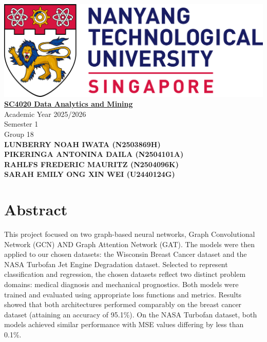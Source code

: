 \documentclass[12pt]{article}
\begin{document}
\begin{center}
    \includegraphics[width=\linewidth]{NTU_Logo.png}
    \\[1cm]
    \underline{\textbf{SC4020 Data Analytics and Mining}}
    \\[1.5em]
    Academic Year 2025/2026
    \\[1em]
    Semester 1
    \\[2em]
    Group 18
    \\[5em]
    \textbf{
        LUNBERRY NOAH IWATA (N2503869H) \\[1em]
        PIKERINGA ANTONINA DAILA (N2504101A) \\[1em]
        RAHLFS FREDERIC MAURITZ (N2504096K) \\[1em]
        SARAH EMILY ONG XIN WEI (U2440124G) \\[1em]
        }
\end{center}
\pagebreak

\justifying

\pagestyle{fancy}
\fancyhf{}  %
\fancyhead[R]{\textcolor{gray}{\nouppercase{\leftmark}}}   %
\fancyfoot[C]{\thepage}  %


\section*{Abstract}

This project focused on two graph-based neural networks, Graph Convolutional Network (GCN) AND Graph Attention Network (GAT).
The models were then applied to our chosen datasets: the Wisconsin Breast Cancer dataset and the NASA Turbofan Jet Engine Degradation dataset.
Selected to represent classification and regression, the chosen datasets reflect two distinct problem domains: medical diagnosis and mechanical prognostics.
Both models were trained and evaluated using appropriate loss functions and metrics.
Results showed that both architectures performed comparably on the breast cancer dataset (attaining an accuracy of 95.1\%).
On the NASA Turbofan dataset, both models achieved similar performance with MSE values differing by less than 0.1\%.
\end{document}
